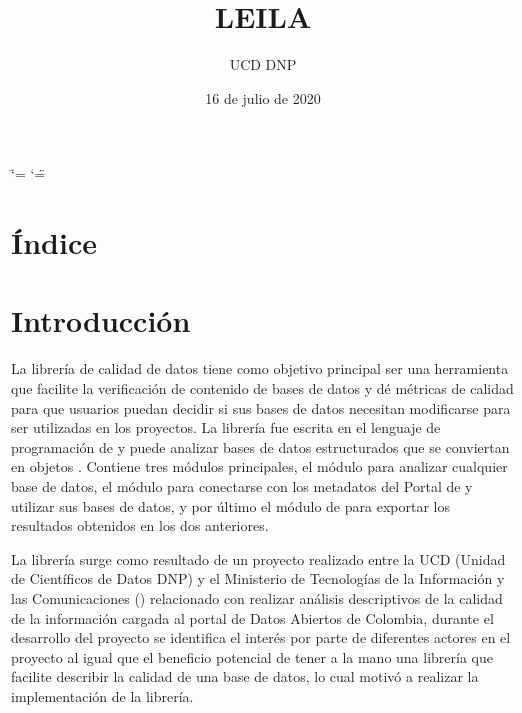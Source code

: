 \documentclass[letterpaper,10pt,openany,spanish]{sphinxmanual}
\title{LEILA}
\date{16 de julio de 2020}
\author{UCD \sphinxhyphen{} DNP}
\begin{document}
\ifdefined\shorthandoff
  \ifnum\catcode`\=\string=\active\shorthandoff{=}\fi
  \ifnum\catcode`\"=\active{}\fi
\fi

\pagestyle{empty}
\sphinxmaketitle
\pagestyle{plain}
\sphinxtableofcontents
\pagestyle{normal}
\label{\detokenize{index::doc}}



\chapter{Índice}
\label{\detokenize{genindex:indice}}\label{\detokenize{genindex:genindex}}\label{\detokenize{genindex::doc}}

\chapter{Introducción}
\label{\detokenize{introduccion:introduccion}}\label{\detokenize{introduccion::doc}}
La librería de calidad de datos tiene como objetivo principal ser una herramienta que facilite la verificación de contenido de bases de datos y dé métricas de calidad para que usuarios puedan decidir si sus bases de datos necesitan modificarse para ser utilizadas en los proyectos. La librería fue escrita en el lenguaje de programación de  y puede analizar bases de datos estructurados que se conviertan en objetos . Contiene tres módulos principales, el módulo {\hyperref[\detokenize{calidad_datos:calidad-datos}]{}} para analizar cualquier base de datos, el módulo {\hyperref[\detokenize{datos_gov:datos-gov}]{}} para conectarse con los metadatos del Portal de  y utilizar sus bases de datos, y por último el módulo de {\hyperref[\detokenize{reporte:reporte}]{}} para exportar los resultados obtenidos en los dos anteriores.

La librería surge como resultado de un proyecto realizado entre la UCD (Unidad de Científicos de Datos \sphinxhyphen{} DNP) y el Ministerio de Tecnologías de la Información y las Comunicaciones () relacionado con realizar análisis descriptivos de la calidad de la información cargada al portal de Datos Abiertos de Colombia, durante el desarrollo del proyecto se identifica el interés por parte de diferentes actores en el proyecto al igual que el beneficio potencial de tener a la mano una librería que facilite describir la calidad de una base de datos, lo cual motivó a realizar la implementación de la librería.
\end{document}
